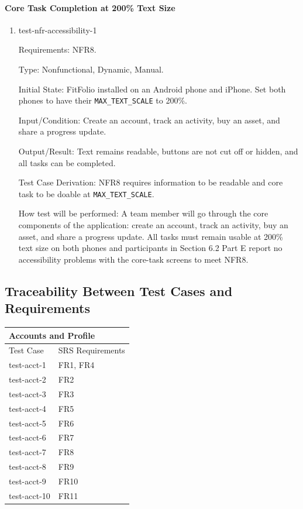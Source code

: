 \documentclass[12pt, titlepage]{article}
\begin{document}
\paragraph{Core Task Completion at 200\% Text Size}

\begin{enumerate}

\item{test-nfr-accessibility-1\\}

Requirements: NFR8.

Type: Nonfunctional, Dynamic, Manual.

Initial State: FitFolio installed on an Android phone and iPhone.
Set both phones to have their \texttt{MAX\_TEXT\_SCALE} to 200\%.

Input/Condition: Create an account, track an activity, buy an asset,
and share a progress update.

Output/Result: Text remains readable, buttons are not cut off or hidden,
and all tasks can be completed. 

Test Case Derivation: NFR8 requires information to be readable and core task to be doable at \texttt{MAX\_TEXT\_SCALE}.

How test will be performed: A team member will go through the core
components of the application: create an account, track an activity,
buy an asset, and share a progress update. All tasks must remain usable
at 200\% text size on both phones and participants in Section 6.2 Part E report no accessibility problems with the core-task screens to meet NFR8.

\end{enumerate}

\subsection{Traceability Between Test Cases and Requirements}



\begin{center}
\begin{tabular}{p{} p{}}
\hline
\multicolumn{2}{l}{Accounts and Profile} \\
\hline
Test Case & SRS Requirements \\
\hline
test-acct-1 & FR1, FR4 \\
test-acct-2 & FR2 \\
test-acct-3 & FR3 \\
test-acct-4 & FR5 \\
test-acct-5 & FR6 \\
test-acct-6 & FR7 \\
test-acct-7 & FR8 \\
test-acct-8 & FR9 \\
test-acct-9 & FR10 \\
test-acct-10 & FR11 \\
\hline
\end{tabular}
\end{center}
\end{document}
